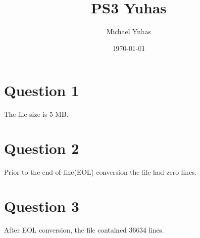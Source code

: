 \documentclass{article}
\title{PS3 Yuhas}
\author{Michael Yuhas}
\date{\today}
\begin{document}
\maketitle
\section{Question 1}
The file size is 5 MB.
\section{Question 2} Prior to the end-of-line(EOL) conversion the file had zero lines. 
\section{Question 3}
After EOL conversion, the file contained 36634 lines.
\end{document}
